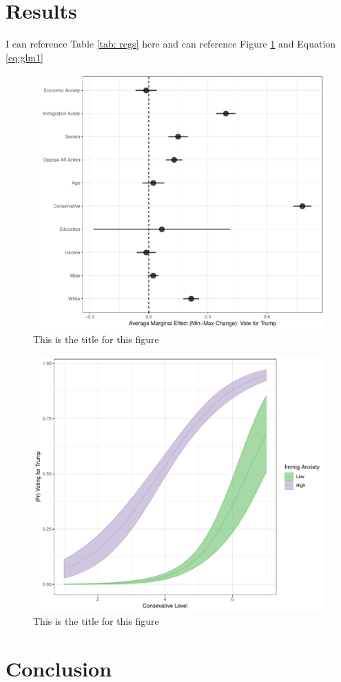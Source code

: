 \documentclass{article}
\begin{document}
\section{Results}

\lipsum[2]

I can reference Table \ref{tab: regs} here and can reference Figure \ref{fig: ame} and Equation \ref{eq:glm1}




\lipsum[5-6]


\begin{figure}
\centering
\caption{This is the title for this figure}
\label{fig: ame}
\includegraphics[scale=.6]{ame_plot}
\end{figure}

\lipsum[5]


\begin{figure}
\centering
\caption{This is the title for this figure}
\label{fig: preds}
\includegraphics[scale=.6]{preds}
\end{figure}

\lipsum[8]

\section{Conclusion}

\lipsum[20-22]
\end{document}
